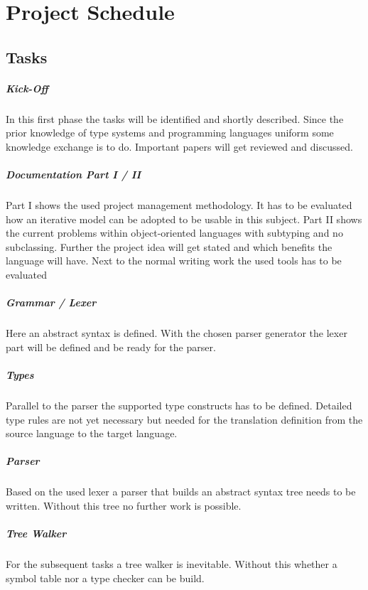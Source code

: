 \chapter{Project Schedule}
\section{Tasks}
\paragraph{Kick-Off}
In this first phase the tasks will be identified and shortly described. Since the prior knowledge of type systems and programming languages uniform some knowledge exchange is to do. Important papers will get reviewed and discussed.

\paragraph{Documentation Part I / II}
Part I shows the used project management methodology. It has to be evaluated how an iterative model can be adopted to be usable in this subject. Part II shows the current problems within object-oriented languages with subtyping and no subclassing. Further the project idea will get stated and which benefits the language will have. Next to the normal writing work the used tools has to be evaluated

\paragraph{Grammar / Lexer}
Here an abstract syntax is defined. With the chosen parser generator the lexer part will be defined and be ready for the parser.

\paragraph{Types}
Parallel to the parser the supported type constructs has to be defined. Detailed type rules are not yet necessary but needed for the translation definition from the source language to the target language.

\paragraph{Parser}
Based on the used lexer a parser that builds an abstract syntax tree needs to be written. Without this tree no further work is possible.

\paragraph{Tree Walker}
For the subsequent tasks a tree walker is inevitable. Without this whether a symbol table nor a type checker can be build.

